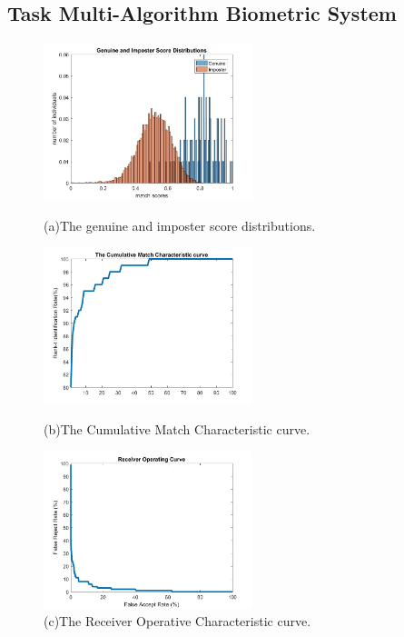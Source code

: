 \documentclass[a4paper]{article}
\begin{document}
\begin{spacing}{2.0}
\section*{\huge\textbf{ Task \uppercase\expandafter{} Multi-Algorithm Biometric System}  }
	\normalsize
	\begin{figure}[H]
	\begin{minipage}[t]{0.3\linewidth}
	\centering
	\includegraphics[width=2.4in]{Part2Dis.jpg}
	\caption{(a)The genuine and imposter score distributions.}
	\label{scoDis2}
	\end{minipage}
	\begin{minipage}[t]{0.3\linewidth}
	\centering
	\includegraphics[width=2.4in]{Part2CMC.jpg}
	\caption{(b)The Cumulative Match Characteristic curve.}
	\label{CMC2}
	\end{minipage}
	\begin{minipage}[t]{0.3\linewidth}
	\centering
	\includegraphics[width=2.4in]{Part2ROC.jpg}
	\caption{(c)The Receiver Operative Characteristic curve.}
	\label{ROC2}
	\end{minipage}
	\end{figure}
	

\end{spacing}
\end{document}
